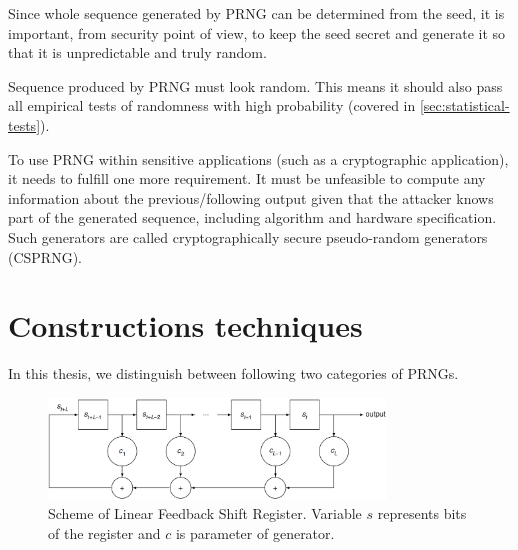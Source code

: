 \documentclass[
    digital,    %
    oneside,    %
    color,
    11pt,
    nocover,
    notable,
    nolof,
    nolot,
    final
]{fithesis3}
\renewcommand\_{\textunderscore\allowbreak}
\begin{document}
Since whole sequence generated by PRNG can be determined from the seed, it is important, from security point of view, to keep the seed secret and generate it so that it is unpredictable and truly random.

Sequence produced by PRNG must look random. This means it should also pass all empirical tests of randomness with high probability (covered in \cref{sec:statistical-tests}). \cite{schneier1996applied}

To use PRNG within sensitive applications (such as a cryptographic application), it needs to fulfill one more requirement. It must be unfeasible to compute any information about the previous/following output given that the attacker knows part of the generated sequence, including algorithm and hardware specification. Such generators are called cryptographically secure pseudo-random generators (CSPRNG). \cite{schneier1996applied}

\section{Constructions techniques}

In this thesis, we distinguish between following two categories of PRNGs.

\begin{figure}[h]
	\centering
	\includegraphics[width=0.8\textwidth]{./images/pictures/lfsr.png}
	\caption{Scheme of Linear Feedback Shift Register. Variable $s$ represents bits of the register and $c$ is parameter of generator. \cite{Canteaut2005}}
	\label{fig:lfsr}
\end{figure}
\end{document}
